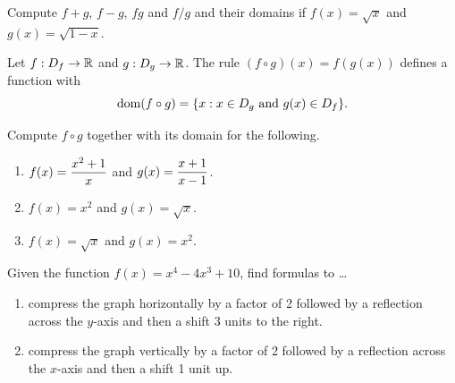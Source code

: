 \begin{example}
Compute $f+g$, $f-g$, $fg$ and $f/g$ and their domains if $f(x)=\sqrt x$ and $g(x)=\sqrt{1-x}$.
\end{example}

\newpage

\begin{definition}
Let $f:D_f\to \mathbb R$ and $g:D_g\to \mathbb R$.
The rule $(f\circ g)(x) = f(g(x))$ defines a function with
$$\mathrm{dom}(f\circ g) = \{x: x\in D_g\text{ and } g(x)\in D_f\}.$$
\end{definition}

\begin{example}
Compute $f\circ g$ together with its domain for the following.
\begin{enumerate}
\item $f(x)=\displaystyle\frac{x^2+1}{x}$ and $g(x)=\displaystyle\frac{x+1}{x-1}$.
\vfill
\item $f(x)=x^2$ and $g(x)=\sqrt x$.
\vfill
\item $f(x)=\sqrt x$ and $g(x)=x^2$.
\vfill
\end{enumerate}
\end{example}

\newpage

\begin{example}
Given the function $f(x)=x^4-4x^3+10$, find formulas to \dots
\begin{enumerate}
\item compress the graph horizontally by a factor of 2 followed by a reflection across the $y$-axis and then a shift 3 units to the right.
\vfill
\item compress the graph vertically by a factor of 2 followed by a reflection across the $x$-axis and then a shift 1 unit up.
\vfill
\end{enumerate}
\end{example}

